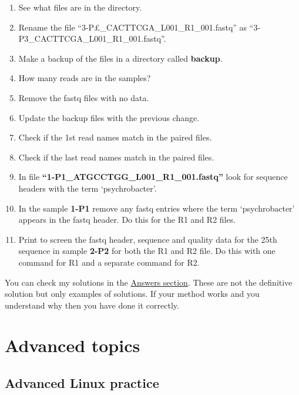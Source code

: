 \documentclass[
  letterpaper,
  DIV=11,
  numbers=noendperiod]{scrreprt}
\providecommand{\tightlist}{%
  \setlength{\itemsep}{0pt}\setlength{\parskip}{0pt}}
\begin{document}
\begin{enumerate}
\def\labelenumi{\arabic{enumi}.}
\tightlist
\item
  See what files are in the directory.\\
\item
  Rename the file ``3-P£\_CACTTCGA\_L001\_R1\_001.fastq'' as
  ``3-P3\_CACTTCGA\_L001\_R1\_001.fastq''.\\
\item
  Make a backup of the files in a directory called \textbf{backup}.\\
\item
  How many reads are in the samples?\\
\item
  Remove the fastq files with no data.
\item
  Update the backup files with the previous change.\\
\item
  Check if the 1st read names match in the paired files.\\
\item
  Check if the last read names match in the paired files.\\
\item
  In file \textbf{``1-P1\_ATGCCTGG\_L001\_R1\_001.fastq''} look for
  sequence headers with the term `psychrobacter'.\\
\item
  In the sample \textbf{1-P1} remove any fastq entries where the term
  `psychrobacter' appears in the fastq header. Do this for the R1 and R2
  files.\\
\item
  Print to screen the fastq header, sequence and quality data for the
  25th sequence in sample \textbf{2-P2} for both the R1 and R2 file. Do
  this with one command for R1 and a separate command for R2.
\end{enumerate}

You can check my solutions in the \hyperref[exercise2_answers]{Answers
section}. These are not the definitive solution but only examples of
solutions. If your method works and you understand why then you have
done it correctly.

\part{Advanced topics}

\chapter{Advanced Linux practice}\label{advancedlinux}
\end{document}
